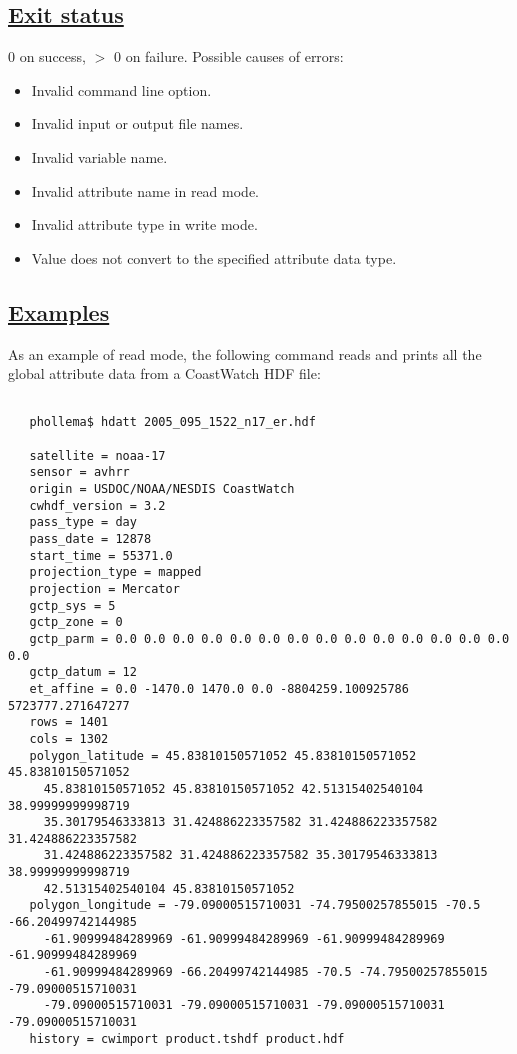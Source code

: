 \subsection*{\underline{Exit status}}


 0 on success, $>$ 0 on failure. Possible causes of errors:
\begin{itemize}
\item  Invalid command line option. 
\item  Invalid input or output file names. 
\item  Invalid variable name. 
\item  Invalid attribute name in read mode. 
\item  Invalid attribute type in write mode. 
\item  Value does not convert to the specified attribute data type. 

\end{itemize}
\subsection*{\underline{Examples}}


 As an example of read mode, the following command reads and prints all the global attribute data from a CoastWatch HDF file:
\begin{verbatim}

   phollema$ hdatt 2005_095_1522_n17_er.hdf

   satellite = noaa-17
   sensor = avhrr
   origin = USDOC/NOAA/NESDIS CoastWatch
   cwhdf_version = 3.2
   pass_type = day
   pass_date = 12878
   start_time = 55371.0
   projection_type = mapped
   projection = Mercator
   gctp_sys = 5
   gctp_zone = 0
   gctp_parm = 0.0 0.0 0.0 0.0 0.0 0.0 0.0 0.0 0.0 0.0 0.0 0.0 0.0 0.0 0.0
   gctp_datum = 12
   et_affine = 0.0 -1470.0 1470.0 0.0 -8804259.100925786 5723777.271647277
   rows = 1401
   cols = 1302
   polygon_latitude = 45.83810150571052 45.83810150571052 45.83810150571052 
     45.83810150571052 45.83810150571052 42.51315402540104 38.99999999998719 
     35.30179546333813 31.424886223357582 31.424886223357582 31.424886223357582 
     31.424886223357582 31.424886223357582 35.30179546333813 38.99999999998719 
     42.51315402540104 45.83810150571052
   polygon_longitude = -79.09000515710031 -74.79500257855015 -70.5 -66.20499742144985 
     -61.90999484289969 -61.90999484289969 -61.90999484289969 -61.90999484289969 
     -61.90999484289969 -66.20499742144985 -70.5 -74.79500257855015 -79.09000515710031 
     -79.09000515710031 -79.09000515710031 -79.09000515710031 -79.09000515710031
   history = cwimport product.tshdf product.hdf
 
\end{verbatim}


